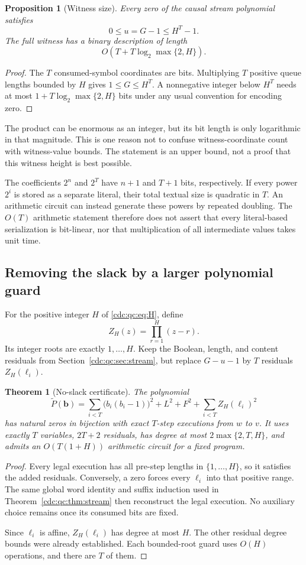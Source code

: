 \documentclass[11pt,a4paper]{article}
\newtheorem{theorem}{Theorem}[section]
\newtheorem{proposition}[proposition]{Proposition}
\theoremstyle{definition}
\theoremstyle{remark}
\begin{document}
\begin{proposition}[Witness size]\label{cdc:qc:prop:height}
Every zero of the causal stream polynomial satisfies
\[
 0\leq u=G-1\leq H^T-1.
\]
The full witness has a binary description of length
\[
 O\!\left(T+T\log_2\max\{2,H\}\right).
\]
\end{proposition}
\begin{proof}
The $T$ consumed-symbol coordinates are bits. Multiplying $T$ positive queue lengths bounded by $H$ gives $1\leq G\leq H^T$. A nonnegative integer below $H^T$ needs at most $1+T\log_2\max\{2,H\}$ bits under any usual convention for encoding zero.
\end{proof}
The product can be enormous as an integer, but its bit length is only logarithmic in that magnitude. This is one reason not to confuse witness-coordinate count with witness-value bounds. The statement is an upper bound, not a proof that this witness height is best possible.

The coefficients $2^n$ and $2^T$ have $n+1$ and $T+1$ bits, respectively. If every power $2^i$ is stored as a separate literal, their total textual size is quadratic in $T$. An arithmetic circuit can instead generate these powers by repeated doubling. The $O(T)$ arithmetic statement therefore does not assert that every literal-based serialization is bit-linear, nor that multiplication of all intermediate values takes unit time.

\subsection{Removing the slack by a larger polynomial guard}
For the positive integer $H$ of \eqref{cdc:qc:eq:H}, define
\[
 Z_H(z)=\prod_{r=1}^{H}(z-r).
\]
Its integer roots are exactly $1,\ldots,H$. Keep the Boolean, length, and content residuals from Section~\ref{cdc:qc:sec:stream}, but replace $G-u-1$ by $T$ residuals $Z_H(\ell_i)$.

\begin{theorem}[No-slack certificate]\label{cdc:qc:thm:no-slack}
The polynomial
\[
 \widetilde P(\mathbf b)
 =\sum_{i<T}\bigl(b_i(b_i-1)\bigr)^2+L^2+F^2
   +\sum_{i<T}Z_H(\ell_i)^2
\]
has natural zeros in bijection with exact $T$-step executions from $w$ to $v$. It uses exactly $T$ variables, $2T+2$ residuals, has degree at most $2\max\{2,T,H\}$, and admits an $O(T(1+H))$ arithmetic circuit for a fixed program.
\end{theorem}
\begin{proof}
Every legal execution has all pre-step lengths in $\{1,\ldots,H\}$, so it satisfies the added residuals. Conversely, a zero forces every $\ell_i$ into that positive range. The same global word identity and suffix induction used in Theorem~\ref{cdc:qc:thm:stream} then reconstruct the legal execution. No auxiliary choice remains once its consumed bits are fixed.

Since $\ell_i$ is affine, $Z_H(\ell_i)$ has degree at most $H$. The other residual degree bounds were already established. Each bounded-root guard uses $O(H)$ operations, and there are $T$ of them.
\end{proof}
\end{document}
